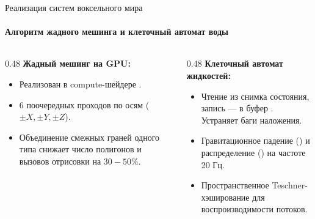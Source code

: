 \begin{frame}{Реализация систем воксельного мира}
  \framesubtitle{Алгоритм жадного мешинга и клеточный автомат воды}
  \begin{columns}[T]
    \begin{column}{0.48\textwidth}
      \textbf{Жадный мешинг на GPU:}
      \begin{itemize}
        \item {} Реализован в compute-шейдере .
        \item {} 6 поочередных проходов по осям ($\pm X, \pm Y, \pm Z$).
        \item {} Объединение смежных граней одного типа снижает число
              полигонов и вызовов отрисовки на $30{-}50\%$.
      \end{itemize}
    \end{column}
    \begin{column}{0.48\textwidth}
      \textbf{Клеточный автомат жидкостей:}
      \begin{itemize}
        \item {} Чтение из снимка состояния, запись --- в буфер
              . Устраняет баги наложения.
        \item {} Гравитационное падение () и распределение
              () на частоте 20 Гц.
        \item {} Пространственное Teschner-хэширование для воспроизводимости потоков.
      \end{itemize}
    \end{column}
  \end{columns}
\end{frame}

